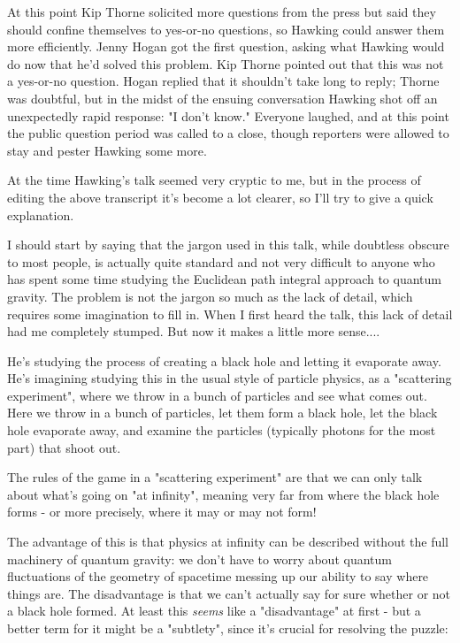 At this point Kip Thorne solicited more questions from the press but
said they should confine themselves to yes-or-no questions, so Hawking
could answer them more efficiently. 
Jenny Hogan got the first question, asking what Hawking would do now
that he'd solved this problem.  Kip Thorne pointed out that this was
not a yes-or-no question.  Hogan replied that it shouldn't take long
to reply; Thorne was doubtful, but in the midst of the ensuing conversation
Hawking shot off an unexpectedly rapid response: "I don't know."  
Everyone
laughed, and at this point the public question period was called to a close,
though reporters were allowed to stay and pester Hawking some more.

At the time Hawking's talk seemed very cryptic to me, but in the process
of editing the above transcript it's become a lot clearer, so I'll try
to give a quick explanation.  

I should start by saying that the jargon used in this talk, while 
doubtless obscure to most people, is actually quite standard and not 
very difficult to anyone who has spent some time studying the Euclidean 
path integral approach to quantum gravity.  The problem is not the 
jargon so much as the lack of detail, which requires some imagination 
to fill in.  When I first heard the talk, this lack of detail had me
completely stumped.  But now it makes a little more sense....

He's studying the process of creating a black hole and letting it
evaporate away.   He's imagining studying this in the usual style
of particle physics, as a "scattering experiment", where we throw in
a bunch of particles and see what comes out.  Here we throw in a bunch
of particles, let them form a black hole, let the black hole evaporate
away, and examine the particles (typically photons for the most part) 
that shoot out.  

The rules of the game in a "scattering experiment" are that we can 
only talk about what's going on "at infinity", meaning very far 
from where the black hole forms - or more precisely, where it may
or may not form!  

The advantage of this is that physics at infinity can be described 
without the full machinery of quantum gravity: we don't have to worry 
about quantum fluctuations of the geometry of spacetime messing up 
our ability to say where things are.  The disadvantage is that we 
can't actually say for sure whether or not a black hole formed.  At
least this \emph{seems} like a "disadvantage" 
at first - but a better term 
for it might be a "subtlety", since it's crucial for resolving the 
puzzle:

